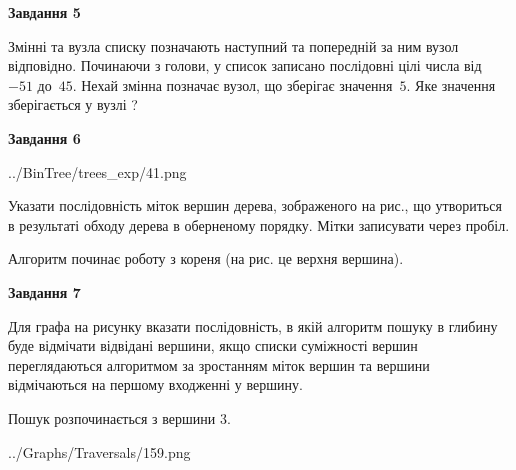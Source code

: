\documentclass[12pt, ukrainian]{article}
\begin{document}
{\begin {large}
{\begin {center}\textbf{Завдання 5}\end {center}}\par
Змінні  та  вузла списку позначають наступний та попередній за ним вузол відповідно. Починаючи з голови, у список записано послідовні цілі числа від~$-51$ до~$45$. Нехай змінна  позначає вузол, що зберігає значення~$5$.
Яке значення зберігається у вузлі  ?\par
\newpage

{\begin {center}\textbf{Завдання 6}\end {center}}\par

\begin{center}
	{../BinTree/trees_exp/41.png}
\end{center}
Указати послідовність міток вершин дерева, зображеного на рис., що утвориться в результаті обходу дерева в оберненому порядку. Мітки записувати через пробіл.\par Алгоритм починає роботу з кореня (на рис. це верхня вершина).\par
\newpage

{\begin {center}\textbf{Завдання 7}\end {center}}\par
Для графа на рисунку вказати послідовність, в якій алгоритм пошуку в глибину буде відмічати відвідані вершини, якщо списки суміжності вершин переглядаються алгоритмом за зростанням міток вершин та вершини відмічаються на першому вход\-женні у вершину.\par
Пошук розпочинається з вершини 3.\par

\begin{center}
	{../Graphs/Traversals/159.png}
\end{center}\par
\newpage


\end{large}}
\end{document}
